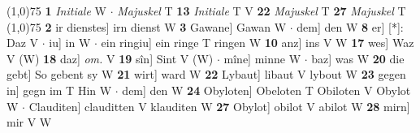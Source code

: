 \documentclass[8pt,a4paper,notitlepage]{article}
\begin{document}
\begin{table}[ht]
\begin{minipage}[t]{0.5\linewidth}
\line(1,0){75} \newline
\textbf{1} \textit{Initiale} W   $\cdot$ \textit{Majuskel} T  \textbf{13} \textit{Initiale} T V  \textbf{22} \textit{Majuskel} T  \textbf{27} \textit{Majuskel} T  \newline
\line(1,0){75} \newline
\textbf{2} ir dienstes] irn dienst W \textbf{3} Gawane] Gawan W  $\cdot$ dem] den W \textbf{8} er] [*]: Daz V  $\cdot$ iu] in W  $\cdot$ ein ringiu] ein ringe T ringen W \textbf{10} anz] ins V W \textbf{17} wes] Waz V (W) \textbf{18} daz] \textit{om.} V \textbf{19} sîn] Sint V (W)  $\cdot$ mîne] minne W  $\cdot$ baz] was W \textbf{20} die gebt] So gebent sy W \textbf{21} wirt] ward W \textbf{22} Lybaut] libaut V lybout W \textbf{23} gegen in] gegn im T Hin W  $\cdot$ dem] den W \textbf{24} Obyloten] Obeloten T Obiloten V Obylot W  $\cdot$ Clauditen] clauditten V klauditen W \textbf{27} Obylot] obilot V abilot W \textbf{28} mirn] mir V W \newline
\end{minipage}
\end{table}
\end{document}
